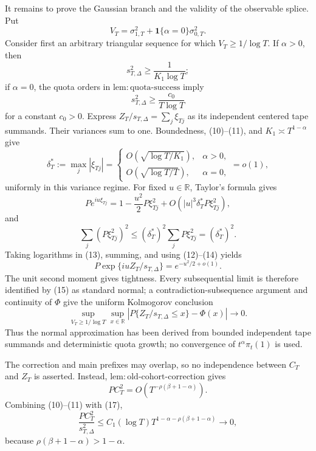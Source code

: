 It remains to prove the Gaussian branch and the validity of the observable splice.  Put
\[
 V_T=\sigma_{1,T}^2+\mathbf 1\{\alpha=0\}\sigma_{0,T}^2. \tag{9}
\]
Consider first an arbitrary triangular sequence for which \(V_T\geq1/\log T\).  If \(\alpha>0\), then
\[
 s_{T,\Delta}^2\geq\frac{1}{K_1\log T}; \tag{10}
\]
if \(\alpha=0\), the quota orders in \(\mathrm{lem:quota\text{-}success}\) imply
\[
 s_{T,\Delta}^2\geq\frac{c_0}{T\log T} \tag{11}
\]
for a constant \(c_0>0\).  Express \(Z_T/s_{T,\Delta}=\sum_j\xi_{Tj}\) as its independent centered tape summands.  Their variances sum to one.  Boundedness, (10)--(11), and \(K_1\asymp T^{1-\alpha}\) give
\[
 \delta_T^*:=\max_j|\xi_{Tj}|=
 \begin{cases}
 O\!\left(\sqrt{\log T/K_1}\right),&\alpha>0,\\
 O\!\left(\sqrt{\log T/T}\right),&\alpha=0,
 \end{cases}
 =o(1), \tag{12}
\]
uniformly in this variance regime.  For fixed \(u\in\mathbb R\), Taylor's formula gives
\[
 P e^{iu\xi_{Tj}}=1-\frac{u^2}{2}P\xi_{Tj}^2
 +O\!\left(|u|^3\delta_T^*P\xi_{Tj}^2\right), \tag{13}
\]
and
\[
 \sum_j(P\xi_{Tj}^2)^2\leq(\delta_T^*)^2\sum_jP\xi_{Tj}^2=(\delta_T^*)^2. \tag{14}
\]
Taking logarithms in (13), summing, and using (12)--(14) yields
\[
 P\exp\{iuZ_T/s_{T,\Delta}\}=e^{-u^2/2+o(1)}. \tag{15}
\]
The unit second moment gives tightness.  Every subsequential limit is therefore identified by (15) as standard normal; a contradiction-subsequence argument and continuity of \(\Phi\) give the uniform Kolmogorov conclusion
\[
 \sup_{V_T\geq1/\log T}\sup_{x\in\mathbb R}
 \left|P\{Z_T/s_{T,\Delta}\leq x\}-\Phi(x)\right|\longrightarrow0. \tag{16}
\]
Thus the normal approximation has been derived from bounded independent tape summands and deterministic quota growth; no convergence of \(t^\alpha\pi_t(1)\) is used.

The correction and main prefixes may overlap, so no independence between \(C_T\) and \(Z_T\) is asserted.  Instead, \(\mathrm{lem:old\text{-}cohort\text{-}correction}\) gives
\[
 PC_T^2=O\!\left(T^{-\rho(\beta+1-\alpha)}\right). \tag{17}
\]
Combining (10)--(11) with (17),
\[
 \frac{PC_T^2}{s_{T,\Delta}^2}
 \leq C_1(\log T)T^{1-\alpha-\rho(\beta+1-\alpha)}\longrightarrow0, \tag{18}
\]
because \(\rho(\beta+1-\alpha)>1-\alpha\).

